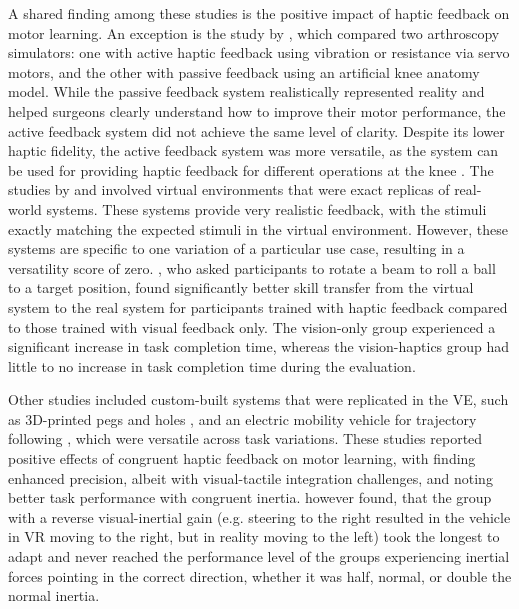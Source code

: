 A shared finding among these studies is the positive impact of haptic feedback on motor learning. An exception is the study by \cite{Vaghela2021}, which compared two arthroscopy simulators: one with active haptic feedback using vibration or resistance via servo motors, and the other with passive feedback using an artificial knee anatomy model. While the passive feedback system realistically represented reality and helped surgeons clearly understand how to improve their motor performance, the active feedback system did not achieve the same level of clarity. Despite its lower haptic fidelity, the active feedback system was more versatile, as the system can be used for providing haptic feedback for different operations at the knee \cite{Vaghela2021}.
The studies by \cite{Vaghela2021} and \cite{Huang2006} involved virtual environments that were exact replicas of real-world systems. These systems provide very realistic feedback, with the stimuli exactly matching the expected stimuli in the virtual environment. However, these systems are specific to one variation of a particular use case, resulting in a versatility score of zero. \cite{Huang2006}, who asked participants to rotate a beam to roll a ball to a target position, found significantly better skill transfer from the virtual system to the real system for participants trained with haptic feedback compared to those trained with visual feedback only. The vision-only group experienced a significant increase in task completion time, whereas the vision-haptics group had little to no increase in task completion time during the evaluation. 

Other studies included custom-built systems that were replicated in the VE, such as 3D-printed pegs and holes \cite{Mohanty2023}, and an electric mobility vehicle for trajectory following \cite{Macuga2019}, which were versatile across task variations. These studies reported positive effects of congruent haptic feedback on motor learning, with \cite{Mohanty2023} finding enhanced precision, albeit with visual-tactile integration challenges, and \cite{Macuga2019} noting better task performance with congruent inertia. \cite{Macuga2019} however found, that the group with a reverse visual-inertial gain (e.g. steering to the right resulted in the vehicle in VR moving to the right, but in reality moving to the left) took the longest to adapt and never reached the performance level of the groups experiencing inertial forces pointing in the correct direction, whether it was half, normal, or double the normal inertia. 

